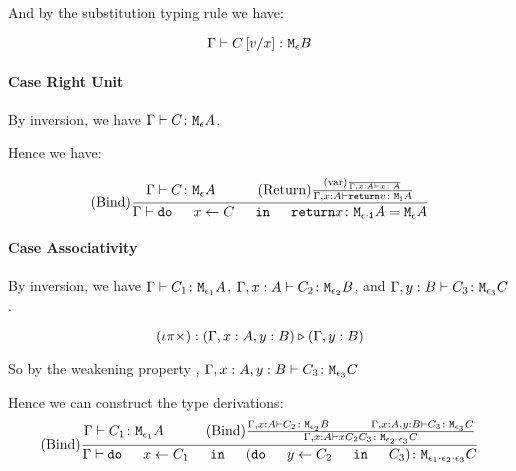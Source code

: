 {        And by the substitution typing rule we have: 

        \begin{equation}
            \gtyperelation{C\ssub{x}{v}}{\meb}
        \end{equation}
        \paragraph{Case Right Unit}
        By inversion, we have $\gtyperelation{C}{\mea}$.

        Hence we have:

        \begin{equation}
            \treerule{Bind}{
                \gtyperelation{C}{\mea}
                \s\s
                \treerule{Return}{\treerule{var}{}{\typerelation{\gax}{x}{A}}}{\typerelation{\gax}{\return{v}}{\moa}}
            }{\gtyperelation{\doin{x}{C}{\return{x}}}{\M{\e\dot\1}{A} = \mea}}
        \end{equation}
        \paragraph{Case Associativity}
        By inversion, we have $\gtyperelation{C_1}{\M{\e_1}{A}}$, $\typerelation{\gax}{C_2}{\M{\e_2}{B}}$, and $\typerelation{\gby}{C_3}{\M{\e_3}{C}}$.

       
        
        $$\wrel{(\i\pi\times)}{(\gax, y: B)}{(\gby)}$$

        So by the weakening property , $\typerelation{\gax, y: B}{C_3}{\M{\e_3}{C}}$

        Hence we can construct the type derivations:
        \begin{equation} 
            \treerule{Bind}{
                \gtyperelation{C_1}{\M{\e_1}{A}}
                \s\s
                \treerule{Bind}{
                    \typerelation{\gax}{C_2}{\M{\e_2}{B}}
                    \s\s
                    \typerelation{\gax, y: B}{C_3}{\M{\e_3}{C}}
                }{
                    \typerelation{\gax}{\do{x}{C_2}{C_3}}{\M{\e_2 \dot \e_3}{C}}
                }
            }{
                \gtyperelation{
                    \doin{x}{C_1}{
                        (\doin{y}{C_2}{C_3})
                    }
                }{
                    \M{\e_1\dot\e_2\dot\e_3}{C}
                }
            }
        \end{equation}

}
